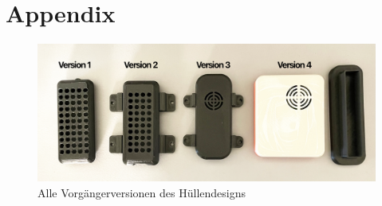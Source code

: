 \documentclass[../main.tex]{subfiles}
\begin{document}
\newpage
\section{Appendix}
\begin{appendix}
    \begin{figure}[!ht]
        \includegraphics[width=\linewidth]{images/huellen_versionen.png}
        \caption{Alle Vorgängerversionen des Hüllendesigns}
        \centering
    \end{figure}
    \printbibliography
\end{appendix}
\end{document}
